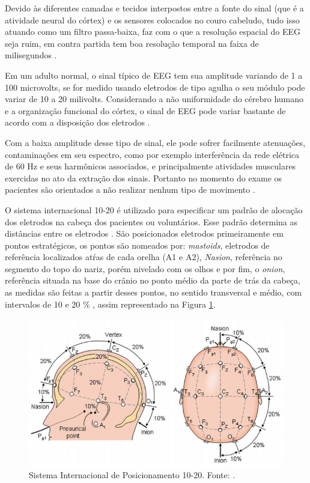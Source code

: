 Devido às diferentes camadas e tecidos interpostos entre a fonte do sinal (que é a atividade neural do córtex) e os sensores colocados no couro cabeludo, tudo isso atuando como um filtro passa-baixa, faz com o que a resolução 
espacial do EEG seja ruim, em contra partida tem boa resolução temporal na faixa de milisegundos \cite{raobrain}.
 
Em um adulto normal, o sinal típico de EEG tem sua amplitude variando de 1 a 100 microvolts, se for medido usando eletrodos de tipo agulha o seu módulo pode variar de 10 a 20 milivolts. Considerando a não uniformidade do cérebro humano e a organização funcional do córtex, o sinal de EEG pode variar bastante de acordo com a disposição dos eletrodos \cite{SIULYDissertacao}.

Com a baixa amplitude desse tipo de sinal, ele pode sofrer facilmente atenuações, contaminações em seu espectro, como por exemplo interferência da rede elétrica de 60 Hz e seus harmônicos associados, e principalmente atividades musculares exercidas no ato da extração dos sinais. Portanto no momento do exame os pacientes são orientados a não realizar nenhum tipo de movimento \cite{raobrain}.

 O sistema internacional 10-20 é utilizado para especificar um padrão de alocação dos eletrodos na cabeça dos pacientes ou voluntários. Esse padrão determina as distâncias entre os eletrodos \cite{Siulybook}. São posicionados eletrodos primeiramente em pontos estratégicos, os pontos são nomeados por: \textit{mastoids}, eletrodos de referência localizados atŕas de cada orelha (A1 e A2), \textit{Nasion}, referência no segmento do topo do nariz, porém nivelado com os olhos e por fim, o \textit{onion}, referência situada na base do crânio no ponto médio da parte de trás da cabeça, as medidas são feitas a partir desses pontos, no sentido transversal e médio,  com intervalos de 10 e 20 \% \cite{raobrain}, assim representado na Figura \ref{padrao1020}.

\begin{figure}[h]
	\centering
	\includegraphics[scale=0.75]{figuras/padrao1020.PNG}
	\caption{Sistema Internacional de Posicionamento 10-20. Fonte: \cite{campisi2012eeg}.}
	\label{padrao1020}
\end{figure}

